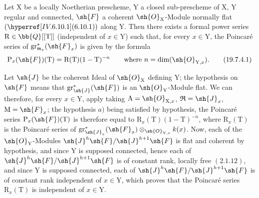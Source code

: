 \begin{corollary}[19.7.4]
\label{IV.19.7.4}
Let $\mathrm{X}$ be a locally Noetherian prescheme, $\mathrm{Y}$ a closed sub-prescheme of $\mathrm{X}$, $\mathrm{Y}$ regular and connected, $\sh{F}$ a coherent $\sh{O}_\mathrm{X}$-Module normally flat $(\sref{IV.6.10.1})$ along $\mathrm{Y}$. Then there exists a formal power series $\mathrm{R}\in\bb{Q}[[\mathrm{T}]]$ (independent of $x\in\mathrm{Y}$) such that, for every $x\in\mathrm{Y}$, the Poincar\'e series of $\operatorname{gr}_{\mathfrak{m}_x}^*(\sh{F}_x)$ is given by the formula
\begin{equation}
  \mathrm{P}_x(\sh{F})(\mathrm{T})=\mathrm{R}(\mathrm{T})(1-\mathrm{T})^{-n}\qquad\text{where }n=\dim(\sh{O}_{\mathrm{Y},x}).
  \tag{19.7.4.1}
\end{equation}

Let $\sh{J}$ be the coherent Ideal of $\sh{O}_\mathrm{X}$ defining $\mathrm{Y}$; the hypothesis on $\sh{F}$ means that $\operatorname{gr}_\sh{J}^*(\sh{F})$ is an $\sh{O}_\mathrm{Y}$-Module flat. We can therefore, for every $x\in\mathrm{Y}$, apply  taking $\mathrm{A}=\sh{O}_{\mathrm{X},x}$, $\mathfrak{R}=\sh{J}_x$, $\mathrm{M}=\sh{F}_x$; the hypothesis $a)$ being satisfied by hypothesis, the Poincar\'e series $\mathrm{P}_x(\sh{F})(\mathrm{T})$ is therefore equal to $\mathrm{R}_x(\mathrm{T})(1-\mathrm{T})^{-n}$, where $\mathrm{R}_x(\mathrm{T})$ is the Poincar\'e series of $\operatorname{gr}_{\sh{J}_x}^*(\sh{F}_x)\otimes_{\sh{O}_{\mathrm{Y},x}}k(x)$. Now, each of the $\sh{O}_\mathrm{Y}$-Modules $\sh{J}^h\sh{F}/\sh{J}^{h+1}\sh{F}$ is flat and coherent by hypothesis, and since $\mathrm{Y}$ is supposed connected, hence each of $\sh{J}^h\sh{F}/\sh{J}^{h+1}\sh{F}$ is of constant rank, locally free $(2.1.12)$, and since $\mathrm{Y}$ is supposed connected, each of $\sh{J}^h\sh{F}/\sh{J}^{h+1}\sh{F}$ is of constant rank independent of $x\in\mathrm{Y}$, which proves that the Poincar\'e series $\mathrm{R}_x(\mathrm{T})$ is independent of $x\in\mathrm{Y}$.
\end{corollary}

